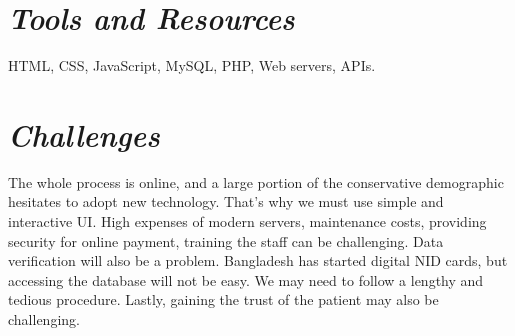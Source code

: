 \documentclass[]{article}
\begin{document}
\section{\texorpdfstring{\textbf{\emph{Tools and Resources
}}}{Tools and Resources }}\label{tools-and-resources}

HTML, CSS, JavaScript, MySQL, PHP, Web servers, APIs.

\section{\texorpdfstring{\textbf{\emph{Challenges}}}{Challenges}}\label{challenges}

The whole process is online, and a large portion of the conservative
demographic hesitates to adopt new technology. That's why we must use
simple and interactive UI. High expenses of modern servers, maintenance
costs, providing security for online payment, training the staff can be
challenging. Data verification will also be a problem. Bangladesh has
started digital NID cards, but accessing the database will not be easy.
We may need to follow a lengthy and tedious procedure. Lastly, gaining
the trust of the patient may also be challenging.
\end{document}
